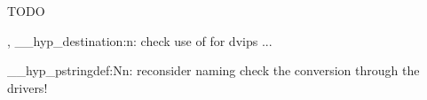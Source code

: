 TODO

\hyper@anchor, \__hyp_destination:n:
check use of \@pdfviewparams for dvips ...


\__hyp_pstringdef:Nn: reconsider naming
check the conversion through the drivers!